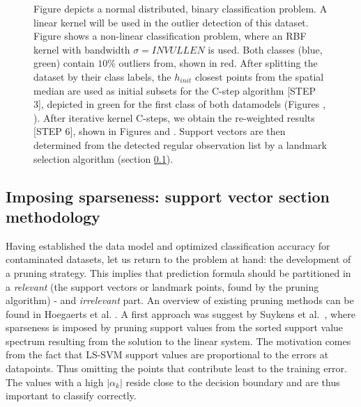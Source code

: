 \documentclass[preprint,12pt]{elsarticle}
\begin{document}
\begin{figure}[!htb]
{			Figure  depicts a normal distributed, binary classification problem. A linear kernel will be used in the outlier detection of this dataset. Figure  shows a non-linear classification problem, where an RBF kernel with bandwidth $\sigma = INVULLEN$ is used.  Both classes (blue, green) contain $10\%$ outliers from, shown in red. After splitting the dataset by their class labels, the $h_ {init}$ closest points from the spatial median are used as initial subsets for the C-step algorithm [STEP 3], depicted in green for the first class of both datamodels (Figures , ). After iterative kernel C-steps, we obtain the re-weighted results  [STEP 6], shown in Figures  and . Support vectors are then determined from the detected regular observation list by a landmark selection algorithm (section \ref{sec:Sparseness}).}
		\label{fig:C-step}
	\end{figure}
	
	
	
	\newpage
	\FloatBarrier
	
	\subsection{Imposing sparseness: support vector section methodology}
	\label{sec:Sparseness}
	
	
	Having established the data model and optimized classification accuracy for contaminated datasets, let us return to the problem at hand: the development of a pruning strategy. This implies that prediction formula should be partitioned in a \textit{relevant} (the support vectors or landmark points, found by the pruning algorithm) - and \textit{irrelevant} part.  An overview of existing pruning methods can be found in Hoegaerts et al. \cite{hoegaerts2004comparison}. A first approach was suggest by Suykens et al.~\cite{suykens2000sparse}, where  sparseness is imposed by pruning support values from the sorted support value spectrum resulting from the solution to the linear system.  The motivation comes from the fact that LS-SVM support values are proportional to the errors at datapoints. Thus omitting the points that contribute least to the training error. The values with a high $|\alpha_k|$ reside close to the decision boundary and are thus important to classify correctly. 
	
\end{document}
